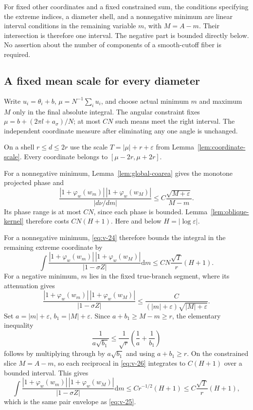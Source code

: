 \documentclass[11pt]{article}
\numberwithin{equation}{section}
\theoremstyle{remark}\newtheorem{remark}[theorem]{Remark}
\newcommand{\dd}{\mathrm d}
\begin{document}
For fixed other coordinates and a fixed constrained sum,
the conditions specifying the extreme indices, a diameter
shell, and a nonnegative minimum are linear interval conditions
in the remaining variable $m$, with $M=A-m$.
Their intersection is therefore one interval. The negative
part is bounded directly below. No assertion about the number
of components of a smooth-cutoff fiber is required.

\subsection{A fixed mean scale for every diameter}


Write $u_i=\theta_i+b$, $\mu=N^{-1}\sum_i u_i$, and choose actual
minimum $m$ and maximum $M$ only in the final absolute integral.
The angular constraint fixes $\mu=b+(2\pi l+a_\sigma)/N$; at most $CN$ such means
meet the right interval. The independent coordinate measure after
eliminating any one angle is unchanged.

On a shell $r\le d\le2r$ use the scale
$T=|\mu|+r+\varepsilon$ from Lemma~\ref{lem:coordinate-scale}.
Every coordinate belongs to $[\mu-2r,\mu+2r]$.

For a nonnegative minimum, Lemma~\ref{lem:global-coarea}
gives the monotone projected phase and
\begin{equation}\label{eq:v-24}
 \frac{|1+\varphi_w(w_m)|\,|1+\varphi_w(w_M)|}
 {|d\nu/dm|}\le C\frac{\sqrt{M+\varepsilon}}{M-m}.
\end{equation}
Its phase range is at most $CN$, since each phase is bounded.
Lemma~\ref{lem:oblique-kernel} therefore costs $CN(H+1)$.
Here and below $H=|\log\varepsilon|$.

For a nonnegative minimum, \eqref{eq:v-24} therefore bounds the integral in
the remaining extreme coordinate by
\begin{equation}\label{eq:v-25}
\int \frac{|1+\varphi_w(w_m)|\,|1+\varphi_w(w_M)|}{|1-\sigma Z|}\dd m
       \le CN\frac{\sqrt T}{r}(H+1).
\end{equation}
For a negative minimum, $m$ lies in the fixed true-branch segment,
where its attenuation gives
\[
 \frac{|1+\varphi_w(w_m)|\,|1+\varphi_w(w_M)|}{|1-\sigma Z|}
 \le \frac{C}{(|m|+\varepsilon)\sqrt{|M|+\varepsilon}}.
\]
Set $a=|m|+\varepsilon$, $b_1=|M|+\varepsilon$. Since
$a+b_1\ge M-m\ge r$, the elementary inequality
\begin{equation}\label{eq:v-26}
\frac1{a\sqrt{b_1}}
 \le \frac1{\sqrt r}\left(\frac1a+\frac1{b_1}\right)
\end{equation}
follows by multiplying through by $a\sqrt{b_1}$ and using
$a+b_1\ge r$. On the constrained slice $M=A-m$, so each reciprocal
in \eqref{eq:v-26} integrates to $C(H+1)$ over a bounded interval. This gives
\begin{equation}\label{eq:v-27}
\int \frac{|1+\varphi_w(w_m)|\,|1+\varphi_w(w_M)|}{|1-\sigma Z|}\dd m
 \le Cr^{-1/2}(H+1)\le C\frac{\sqrt T}{r}(H+1),
\end{equation}
which is the same pair envelope as \eqref{eq:v-25}. 
\end{document}
